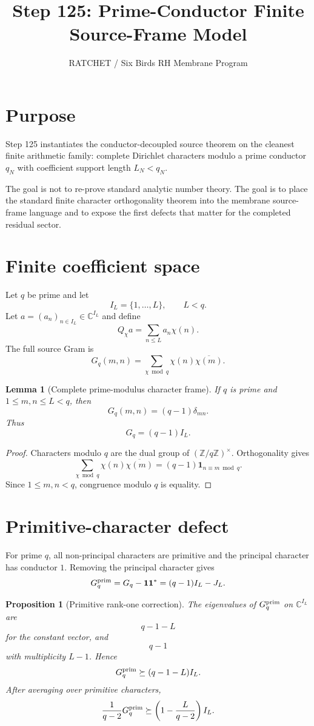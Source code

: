 \documentclass[11pt]{article}
\title{Step 125: Prime-Conductor Finite Source-Frame Model}
\author{RATCHET / Six Birds RH Membrane Program}
\date{}
\newtheorem{lemma}{Lemma}
\newtheorem{proposition}{Proposition}
\newcommand{\C}{\mathbb C}
\begin{document}
\maketitle

\section{Purpose}
Step 125 instantiates the conductor-decoupled source theorem on the cleanest finite arithmetic family: complete Dirichlet characters modulo a prime conductor $q_N$ with coefficient support length $L_N<q_N$.

The goal is not to re-prove standard analytic number theory.  The goal is to place the standard finite character orthogonality theorem into the membrane source-frame language and to expose the first defects that matter for the completed residual sector.

\section{Finite coefficient space}
Let $q$ be prime and let
\[
  I_L=\{1,\dots,L\},\qquad L<q.
\]
Let $a=(a_n)_{n\in I_L}\in \C^{I_L}$ and define
\[
  Q_\chi a=\sum_{n\le L} a_n\chi(n).
\]
The full source Gram is
\[
  G_q(m,n)=\sum_{\chi\bmod q}\chi(n)\overline{\chi(m)}.
\]

\begin{lemma}[Complete prime-modulus character frame]
If $q$ is prime and $1\le m,n\le L<q$, then
\[
  G_q(m,n)=(q-1)\delta_{mn}.
\]
Thus
\[
  G_q=(q-1)I_L.
\]
\end{lemma}

\begin{proof}
Characters modulo $q$ are the dual group of $(\mathbb Z/q\mathbb Z)^\times$.  Orthogonality gives
\[
\sum_{\chi\bmod q}\chi(n)\overline{\chi(m)}
=(q-1)\mathbf 1_{n\equiv m\bmod q}.
\]
Since $1\le m,n<q$, congruence modulo $q$ is equality.
\end{proof}

\section{Primitive-character defect}
For prime $q$, all non-principal characters are primitive and the principal character has conductor $1$.  Removing the principal character gives
\[
  G_q^{\rm prim}=G_q-\mathbf 1\mathbf 1^*=(q-1)I_L-J_L.
\]

\begin{proposition}[Primitive rank-one correction]
The eigenvalues of $G_q^{\rm prim}$ on $\C^{I_L}$ are
\[
  q-1-L
\]
for the constant vector, and
\[
  q-1
\]
with multiplicity $L-1$.  Hence
\[
  G_q^{\rm prim}\succeq (q-1-L)I_L.
\]
After averaging over primitive characters,
\[
  \frac{1}{q-2}G_q^{\rm prim}\succeq \left(1-\frac{L}{q-2}\right)I_L.
\]
\end{proposition}
\end{document}
